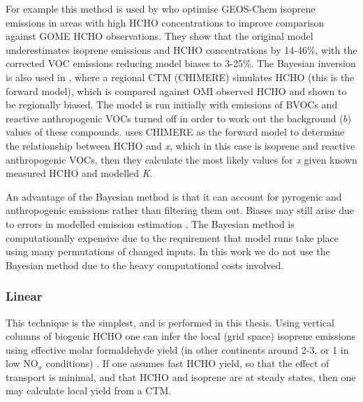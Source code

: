       For example this method is used by \textcite{Shim2005} who optimise GEOS-Chem isoprene emissions in areas with high HCHO concentrations to improve comparison against GOME HCHO observations. %
      They show that the original model underestimates isoprene emissions and HCHO concentrations by 14-46\%, with the corrected VOC emissions reducing model biases to 3-25\%.
      The Bayesian inversion is also used in \textcite{Curci2010}, where a regional CTM (CHIMERE) simulates HCHO (this is the forward model), which is compared against OMI observed HCHO and shown to be regionally biased.
      The model is run initially with emissions of BVOCs and reactive anthropogenic VOCs turned off in order to work out the background ($b$) values of these compounds.
      \textcite{Curci2010} uses CHIMERE as the forward model to determine the relationship between HCHO and \emph{x}, which in this case is isoprene and reactive anthropogenic VOCs, then they calculate the most likely values for \emph{x} given known measured HCHO and modelled \emph{K}.
      
      
      An advantage of the Bayesian method is that it can account for pyrogenic and anthropogenic emissions rather than filtering them out.
      Biases may still arise due to errors in modelled emission estimation \parencite{Curci2010}.
      The Bayesian method is computationally expensive due to the requirement that model runs take place using many permutations of changed inputs.
      In this work we do not use the Bayesian method due to the heavy computational costs involved.
      
        
    
    \subsubsection{Linear}
      \label{BioIsop:intro:top_down_linear}
      
      This technique is the simplest, and is performed in this thesis.
      Using vertical columns of biogenic HCHO one can infer the local (grid space) isoprene emissions using effective molar formaldehyde yield (in other continents around 2-3, or 1 in low NO$_x$ conditions) \parencite{Palmer2003,Marais2012,Bauwens2016}.
      If one assumes fast HCHO yield, so that the effect of transport is minimal, and that HCHO and isoprene are at steady states, then one may calculate local yield from a CTM.
      
